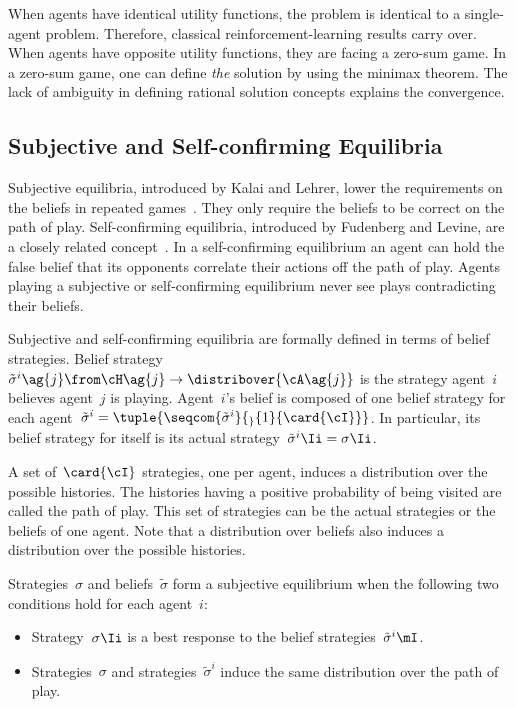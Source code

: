 When agents have identical utility functions, the problem is identical to a single-agent problem.
Therefore, classical reinforcement-learning results carry over.
When agents have opposite utility functions, they are facing a zero-sum game.
In a zero-sum game, one can define \emph{the} solution by using the minimax theorem.
The lack of ambiguity in defining rational solution concepts explains the convergence.

\subsection{Subjective and Self-confirming Equilibria}
Subjective equilibria, introduced by Kalai and Lehrer, lower the requirements on the beliefs in repeated games~\cite{kalai_lehrer:1993:subjective}.
They only require the beliefs to be correct on the path of play.
Self-confirming equilibria, introduced by Fudenberg and Levine, are a closely related concept~\cite{fudenberg_levine:1993}.
In a self-confirming equilibrium an agent can hold the false belief that its opponents correlate their actions off the path of play.
Agents playing a subjective or self-confirming equilibrium never see plays contradicting their beliefs.

\newcommand{\belief}{^}
Subjective and self-confirming equilibria are formally defined in terms of belief strategies.
Belief strategy~\(\tilde{\sigma}\belief{i}\ag{j} \from \cH\ag{j} \to \distribover{\cA\ag{j}}\) is the strategy agent~\(i\) believes agent~\(j\) is playing.
Agent~\(i\)'s belief is composed of one belief strategy for each agent~\(\tilde{\sigma}\belief{i} = \tuple{\seqcom{\tilde{\sigma}\belief{i}}{_}{1}{\card{\cI}}}\).
In particular, its belief strategy for itself is its actual strategy~\(\tilde{\sigma}\belief{i}\Ii = \sigma\Ii\).

A set of~\(\card{\cI}\) strategies, one per agent, induces a distribution over the possible histories.
The histories having a positive probability of being visited are called the path of play.
This set of strategies can be the actual strategies or the beliefs of one agent.
Note that a distribution over beliefs also induces a distribution over the possible histories.

Strategies~\(\sigma\) and beliefs~\(\tilde{\sigma}\) form a subjective equilibrium when the following two conditions hold for each agent~\(i\):
\begin{itemize}
\item Strategy~\(\sigma\Ii\) is a best response to the belief strategies~\(\tilde{\sigma}\belief{i}\mI\).
\item Strategies~\(\sigma\) and strategies~\(\tilde{\sigma}\belief{i}\) induce the same distribution over the path of play.
\end{itemize}

